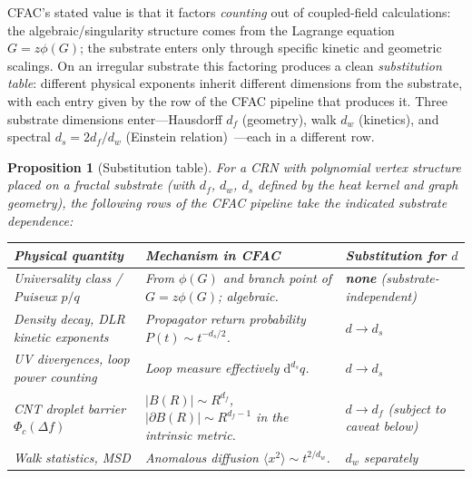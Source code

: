 \documentclass[11pt,a4paper]{article}
\newcommand{\dd}{\mathrm{d}}
\theoremstyle{plain}
\newtheorem{proposition}[theorem]{Proposition}
\begin{document}
CFAC's stated value is that it factors \emph{counting} out of
coupled-field calculations: the algebraic/singularity structure
comes from the Lagrange equation $G = z\phi(G)$; the substrate
enters only through specific kinetic and geometric scalings.  On
an irregular substrate this factoring produces a clean
\emph{substitution table}: different physical exponents inherit
different dimensions from the substrate, with each entry given
by the row of the CFAC pipeline that produces it.  Three
substrate dimensions enter---Hausdorff $d_f$ (geometry), walk $d_w$
(kinetics), and spectral $d_s = 2 d_f/d_w$ (Einstein
relation)~\citep{AlexanderOrbach,RammalToulouse,Havlin,BenAvrahamHavlin2000,BarlowStFlour}---each
in a different row.

\begin{proposition}[Substitution table]
\label{prop:substitution-table}
For a CRN with polynomial vertex structure placed on a fractal
substrate (with $d_f$, $d_w$, $d_s$ defined by the heat kernel
and graph geometry), the following rows of the CFAC pipeline take
the indicated substrate dependence:
\begin{center}\small
\begin{tabular}{@{}p{}p{}p{}@{}}
\toprule
Physical quantity & Mechanism in CFAC & Substitution for $d$ \\\midrule
Universality class / Puiseux $p/q$
  & From $\phi(G)$ and branch point of $G = z\phi(G)$; algebraic.
  & \textbf{none} (substrate-independent) \\\addlinespace
Density decay, DLR kinetic exponents
  & Propagator return probability $P(t) \sim t^{-d_s/2}$.
  & $d \to d_s$ \\\addlinespace
UV divergences, loop power counting
  & Loop measure effectively $\dd^{d_s} q$.
  & $d \to d_s$ \\\addlinespace
CNT droplet barrier $\Phi_c(\Delta f)$
  & $|B(R)| \sim R^{d_f}$, $|\partial B(R)| \sim R^{d_f - 1}$
    in the \emph{intrinsic} metric.
  & $d \to d_f$ (subject to caveat below) \\\addlinespace
Walk statistics, MSD
  & Anomalous diffusion $\langle x^2\rangle \sim t^{2/d_w}$.
  & $d_w$ \emph{separately} \\
\bottomrule
\end{tabular}
\end{center}
\end{proposition}
\end{document}
